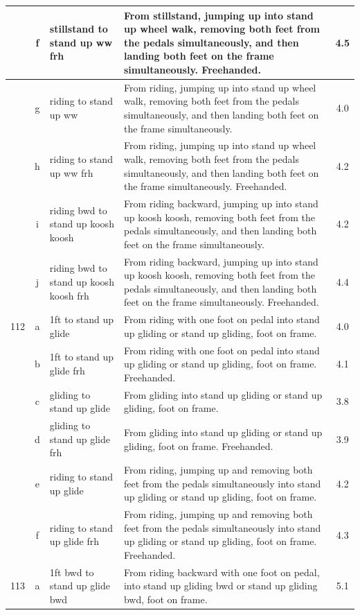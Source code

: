 \begin{longtable}{|r|c|p{4cm}|p{8cm}|c|}
\hline
  & f & stillstand to stand up ww frh & From stillstand, jumping up into stand up wheel walk, removing both feet from the pedals simultaneously, and then landing both feet on the frame simultaneously. Freehanded.  & 4.5 \\ 
\hline
  & g & riding to stand up ww & From riding, jumping up into stand up wheel walk, removing both feet from the pedals simultaneously, and then landing both feet on the frame simultaneously.  & 4.0 \\ 
\hline
  & h & riding to stand up ww frh & From riding, jumping up into stand up wheel walk, removing both feet from the pedals simultaneously, and then landing both feet on the frame simultaneously. Freehanded.  & 4.2 \\ 
\hline
  & i & riding bwd to stand up koosh koosh  & From riding backward, jumping up into stand up koosh koosh, removing both feet from the pedals simultaneously, and then landing both feet on the frame simultaneously.  & 4.2 \\ 
\hline
  & j & riding bwd to stand up koosh koosh frh  & From riding backward, jumping up into stand up koosh koosh, removing both feet from the pedals simultaneously, and then landing both feet on the frame simultaneously. Freehanded.  & 4.4 \\ 
\hline
112 & a & 1ft to stand up glide & From riding with one foot on pedal into stand up gliding or stand up gliding, foot on frame.  & 4.0 \\ 
\hline
  & b & 1ft to stand up glide frh & From riding with one foot on pedal into stand up gliding or stand up gliding, foot on frame. Freehanded.  & 4.1 \\ 
\hline
  & c & gliding to stand up glide & From gliding into stand up gliding or stand up gliding, foot on frame.  & 3.8 \\ 
\hline
  & d & gliding to stand up glide frh & From gliding into stand up gliding or stand up gliding, foot on frame. Freehanded.  & 3.9 \\ 
\hline
  & e & riding to stand up glide  & From riding, jumping up and removing both feet from the pedals simultaneously into stand up gliding or stand up gliding, foot on frame. & 4.2 \\ 
\hline
  & f & riding to stand up glide frh  & From riding, jumping up and removing both feet from the pedals simultaneously into stand up gliding or stand up gliding, foot on frame. Freehanded. & 4.3 \\ 
\hline
113 & a & 1ft bwd to stand up glide bwd & From riding backward with one foot on pedal, into stand up gliding bwd or stand up gliding bwd, foot on frame.  & 5.1 \\ 

\end{longtable}

